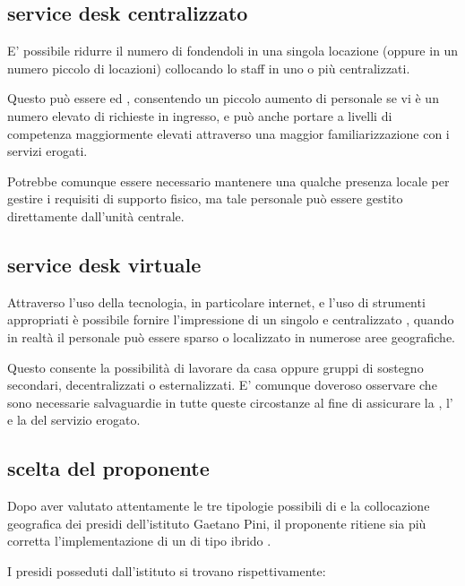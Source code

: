 \subsection[Service Desk Centralizzato]{service desk centralizzato}
\label{sd-centralized-sd}
E' possibile ridurre il numero di  fondendoli in una singola locazione (oppure in un numero piccolo di locazioni) collocando lo staff in uno o più  centralizzati.

Questo può essere  ed , consentendo un piccolo aumento di personale se vi è un numero elevato di richieste in ingresso, e può anche portare a livelli di competenza maggiormente elevati attraverso una maggior familiarizzazione con i servizi erogati.

Potrebbe comunque essere necessario mantenere una qualche presenza locale per gestire i requisiti di supporto fisico, ma tale personale può essere gestito direttamente dall'unità centrale.

\subsection[Service Desk Virtuale]{service desk virtuale}
\label{sd-virtual-sd}
Attraverso l'uso della tecnologia, in particolare internet, e l'uso di strumenti appropriati è possibile fornire l'impressione di un singolo e centralizzato , quando in realtà il personale può essere sparso o localizzato in numerose aree geografiche.

Questo consente la possibilità di lavorare da casa oppure gruppi di sostegno secondari, decentralizzati o esternalizzati. E' comunque doveroso osservare che sono necessarie salvaguardie in tutte queste circostanze al fine di assicurare la , l' e la  del servizio erogato.

\subsection[Scelta del proponente]{scelta del proponente}
Dopo aver valutato attentamente le tre tipologie possibili di  e la collocazione geografica dei presidi dell'istituto Gaetano Pini, il proponente ritiene sia più corretta l'implementazione di un  di tipo ibrido .

I presidi posseduti dall'istituto si trovano rispettivamente:

